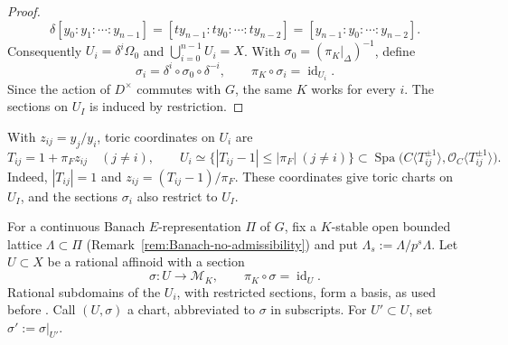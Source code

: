 \documentclass[11pt]{article}
\theoremstyle{definition}
\newcommand{\cO}{\mathcal O}
\newcommand{\cM}{\mathcal M}
\begin{document}
\begin{proof}
\begin{equation*}
 \delta[y_0:y_1:\cdots:y_{n-1}]
   =[t y_{n-1}:t y_0:\cdots:t y_{n-2}]
   =[y_{n-1}:y_0:\cdots:y_{n-2}].
\end{equation*}
Consequently \(U_i=\delta^i\Omega_0\) and
\(\bigcup_{i=0}^{n-1}U_i=X\).  With
\(\sigma_0=(\pi_K|_\Delta)^{-1}\), define
\begin{equation*}
 \sigma_i=\delta^i\circ\sigma_0\circ\delta^{-i},
 \qquad \pi_K\circ\sigma_i=\operatorname{id}_{U_i}.
\end{equation*}
Since the action of \(D^\times\) commutes with \(G\), the same \(K\) works
for every \(i\).  The sections on \(U_I\) is induced by restriction.
\end{proof}

With \(z_{ij}=y_j/y_i\), toric coordinates on \(U_i\) are
\begin{equation}\label{eq:cover-toric-coordinates}
 T_{ij}=1+\pi_F z_{ij}\quad(j\ne i),\qquad
 U_i\simeq\{ |T_{ij}-1|\leq|\pi_F|\ (j\ne i)\}
       \subset\operatorname{Spa}
          \bigl(C\langle T_{ij}^{\pm1}\rangle,
                \cO_C\langle T_{ij}^{\pm1}\rangle\bigr).
\end{equation}
Indeed, \(|T_{ij}|=1\) and \(z_{ij}=(T_{ij}-1)/\pi_F\).
These coordinates give toric charts on \(U_I\), and the sections \(\sigma_i\) also restrict to \(U_I\).

For a continuous Banach \(E\)-representation \(\Pi\) of \(G\),
fix a \(K\)-stable open bounded lattice \(\Lambda\subset\Pi\)
(Remark~\ref{rem:Banach-no-admissibility}) and put
\(\Lambda_s:=\Lambda/p^s\Lambda\).  Let \(U\subset X\)
be a rational affinoid with a section
\begin{equation*}
 \sigma:U\longrightarrow\cM_K,
 \qquad \pi_K\circ\sigma=\operatorname{id}_U.
\end{equation*}
Rational subdomains of the \(U_i\), with restricted sections,
form a basis, as used before \cite[Lemma~3.7]{Scholze}.
Call \((U,\sigma)\) a chart, abbreviated to \(\sigma\) in
subscripts.  For \(U'\subset U\), set
\(\sigma':=\sigma|_{U'}\).%
\end{document}
